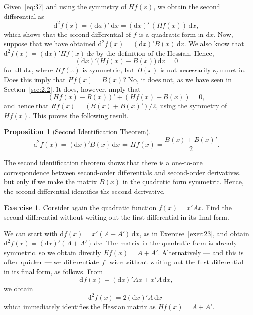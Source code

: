 \documentclass[12pt,a4paper]{article}
\makeatletter
\theoremstyle{definition}
\newtheorem{proposition}{Proposition}
\newtheorem{exercise}{Exercise}
\renewenvironment{proof}[1][\proofname]{\par
  \pushQED{\qed}%
  \normalfont \topsep6\p@\@plus6\p@\relax
  \trivlist
  \item[\hskip\labelsep\bfseries #1\@addpunct{.}]\ignorespaces
}{%
  \popQED\endtrivlist\@endpefalse
}
\newenvironment{solution}{%
  \begin{proof}[Solution]%
}{%
  \end{proof}%
}
\newcommand{\dd}{\mathrm{d}}
\makeatother
\begin{document}
Given~\eqref{eq:37} and using the symmetry of $Hf(x)$, we obtain the second differential as
\begin{equation}\label{eq:40}
\dd^2 f(x) = (\dd a)'\, \dd x = (\dd x)'\, (Hf(x))\, \dd x,
\end{equation}
which shows that the second differential of $f$ is a quadratic form in $\dd x$. Now, suppose that we have obtained $\dd^2 f(x) = (\dd x)' B(x)\, \dd x$. We also know that $\dd^2 f(x) = (\dd x)' Hf(x)\, \dd x$ by the definition of the Hessian. Hence,
\[
(\dd x)'\bigl(Hf(x) - B(x)\bigr)\, \dd x = 0
\]
for all $\dd x$, where $Hf(x)$ is symmetric, but $B(x)$ is not necessarily symmetric. Does this imply that $Hf(x) = B(x)$? No, it does not, as we have seen in Section~\ref{sec:2.2}. It does, however, imply that
\[
(Hf(x) - B(x))' + (Hf(x) - B(x)) = 0,
\]
and hence that $Hf(x) = (B(x) + B(x)')/2$, using the symmetry of $Hf(x)$. %
This proves the following result.

\begin{proposition}[Second Identification Theorem]\label{prp:13}
\[
\dd^2 f(x) = (\dd x)' B(x)\, \dd x \iff Hf(x) = \frac{B(x) + B(x)'}{2}.
\]
\end{proposition}

The second identification theorem shows that there is a one-to-one correspondence between second-order differentials and second-order derivatives, but only if we make the matrix $B(x)$ in the quadratic form symmetric. Hence, the second differential identifies the second derivative. %

\begin{exercise}\label{exer:25}
Consider again the quadratic function $f(x) = x'Ax$. Find the second differential without writing out the first differential in its final form.
\end{exercise}

\begin{solution}
We can start with $\dd f(x) = x'(A + A')\, \dd x$, as in Exercise~\ref{exer:23}, and obtain $\dd^2 f(x) = (\dd x)'(A + A')\, \dd x$. The matrix in the quadratic form is already symmetric, so we obtain directly $Hf(x) = A + A'$. Alternatively --- and this is often quicker --- we differentiate $f$ twice without writing out the first differential in its final form, as follows. From
\[
\dd f(x) = (\dd x)'Ax + x'A\, \dd x,
\]
we obtain
\[
\dd^2 f(x) = 2(\dd x)'A\, \dd x,
\]
which immediately identifies the Hessian matrix as $Hf(x) = A + A'$. %
\end{solution}
\end{document}
